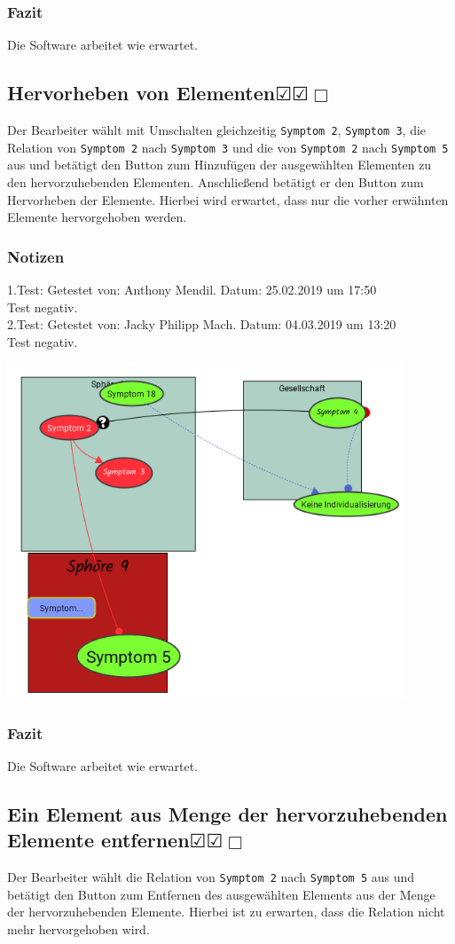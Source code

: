 \documentclass[enabledeprecatedfontcommands]{scrartcl}
\newcommand{\subsectiont}[2]{\subsection[#1]{#1{\normalsize\normalfont #2}}}
\newcommand{\leer}{$\Box$}
\newcommand{\ok}{$\CheckedBox$}
\begin{document}
\subsubsection{Fazit}
Die Software arbeitet wie erwartet.

\subsectiont{Hervorheben von Elementen}{\dotfill\ok\ok\leer}
Der Bearbeiter wählt mit Umschalten gleichzeitig \texttt{Symptom 2}, \texttt{Symptom 3}, die Relation von \texttt{Symptom 2} nach \texttt{Symptom 3} und die von \texttt{Symptom 2} nach \texttt{Symptom 5} aus und betätigt den Button zum Hinzufügen der ausgewählten Elementen zu den hervorzuhebenden Elementen.  Anschließend betätigt er den Button zum Hervorheben der Elemente. Hierbei wird erwartet, dass nur die vorher erwähnten Elemente hervorgehoben werden. 
\subsubsection{Notizen}
1.Test: Getestet von: Anthony Mendil. Datum: 25.02.2019 um 17:50 \\
Test negativ. \\
2.Test: Getestet von: Jacky Philipp Mach. Datum: 04.03.2019 um 13:20 \\
Test negativ.
\begin{center}
\includegraphics[height=10cm]{3_56.PNG}
\end{center}
\subsubsection{Fazit}
Die Software arbeitet wie erwartet.

\subsectiont{Ein Element aus Menge der hervorzuhebenden \\Elemente entfernen}{\dotfill\ok\ok\leer}
Der Bearbeiter wählt die Relation von \texttt{Symptom 2} nach \texttt{Symptom 5} aus und betätigt den Button zum Entfernen des ausgewählten Elements aus der Menge der hervorzuhebenden Elemente. Hierbei ist zu erwarten, dass die Relation nicht mehr hervorgehoben wird. 
\end{document}
